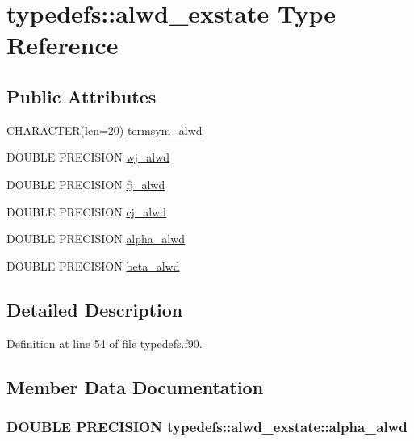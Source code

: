 \hypertarget{typetypedefs_1_1alwd__exstate}{
\section{typedefs::alwd\_\-exstate Type Reference}
\label{typetypedefs_1_1alwd__exstate}
}
\subsection*{Public Attributes}
\begin{DoxyCompactItemize}
\item 
CHARACTER(len=20) \hyperlink{typetypedefs_1_1alwd__exstate_a50bb7f5c8fb7c9b0d3163fc8c9d59ffb}{termsym\_\-alwd}
\item 
DOUBLE PRECISION \hyperlink{typetypedefs_1_1alwd__exstate_a9af30d9eafe61b2467f45a93bd9784d4}{wj\_\-alwd}
\item 
DOUBLE PRECISION \hyperlink{typetypedefs_1_1alwd__exstate_af4f9dd8da0478384d513170e6a27ed5f}{fj\_\-alwd}
\item 
DOUBLE PRECISION \hyperlink{typetypedefs_1_1alwd__exstate_ab6b82be801ff29ffee0964542c954f40}{cj\_\-alwd}
\item 
DOUBLE PRECISION \hyperlink{typetypedefs_1_1alwd__exstate_a33893b22b042d2f842d76212b2841830}{alpha\_\-alwd}
\item 
DOUBLE PRECISION \hyperlink{typetypedefs_1_1alwd__exstate_ade69cd51a1551171ecba3fe034aae174}{beta\_\-alwd}
\end{DoxyCompactItemize}


\subsection{Detailed Description}


Definition at line 54 of file typedefs.f90.

\subsection{Member Data Documentation}
\hypertarget{typetypedefs_1_1alwd__exstate_a33893b22b042d2f842d76212b2841830}{
\subsubsection[{alpha\_\-alwd}]{\setlength{\rightskip}{0pt plus 5cm}DOUBLE PRECISION {\bf typedefs::alwd\_\-exstate::alpha\_\-alwd}}}
\label{typetypedefs_1_1alwd__exstate_a33893b22b042d2f842d76212b2841830}


